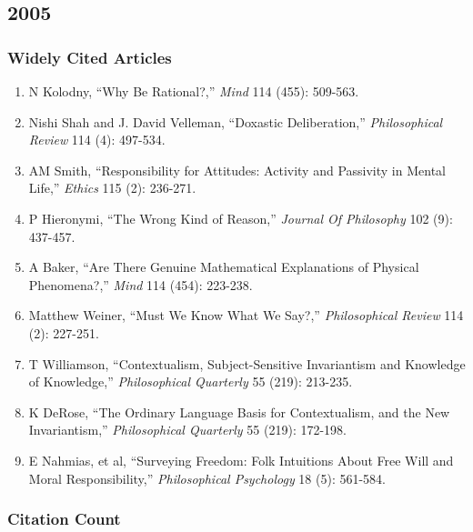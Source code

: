 \documentclass[
  10pt,
  letterpaper,
  DIV=11,
  numbers=noendperiod,
  twoside]{scrartcl}
\providecommand{\tightlist}{%
  \setlength{\itemsep}{0pt}\setlength{\parskip}{0pt}}\usepackage{longtable,booktabs,array}
\begin{document}
\newpage

\subsection{2005}\label{sec-s2005}

\subsubsection*{Widely Cited Articles}\label{widely-cited-articles-29}

\begin{enumerate}
\def\labelenumi{\arabic{enumi}.}
\tightlist
\item
  N Kolodny, ``Why Be Rational?,'' \emph{Mind} 114 (455): 509-563.
\item
  Nishi Shah and J. David Velleman, ``Doxastic Deliberation,''
  \emph{Philosophical Review} 114 (4): 497-534.
\item
  AM Smith, ``Responsibility for Attitudes: Activity and Passivity in
  Mental Life,'' \emph{Ethics} 115 (2): 236-271.
\item
  P Hieronymi, ``The Wrong Kind of Reason,'' \emph{Journal Of
  Philosophy} 102 (9): 437-457.
\item
  A Baker, ``Are There Genuine Mathematical Explanations of Physical
  Phenomena?,'' \emph{Mind} 114 (454): 223-238.
\item
  Matthew Weiner, ``Must We Know What We Say?,'' \emph{Philosophical
  Review} 114 (2): 227-251.
\item
  T Williamson, ``Contextualism, Subject-Sensitive Invariantism and
  Knowledge of Knowledge,'' \emph{Philosophical Quarterly} 55 (219):
  213-235.
\item
  K DeRose, ``The Ordinary Language Basis for Contextualism, and the New
  Invariantism,'' \emph{Philosophical Quarterly} 55 (219): 172-198.
\item
  E Nahmias, et al, ``Surveying Freedom: Folk Intuitions About Free Will
  and Moral Responsibility,'' \emph{Philosophical Psychology} 18 (5):
  561-584.
\end{enumerate}

\subsubsection*{Citation Count}\label{sec-count-2005}
\end{document}
